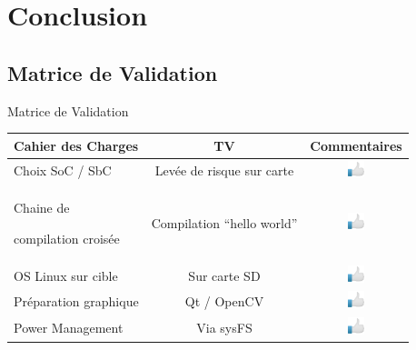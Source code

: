 \documentclass[11pt]{beamer}
\begin{document}
	
	\section{Conclusion}
	\subsection{Matrice de Validation}
	\begin{frame}{Matrice de Validation}

	\begin{center}
	\begin{tabular}{|p{3cm}|c|c|}
			\hline
			\rowcolor{yellow}Cahier des Charges & TV & Commentaires\\
			\hline
			 \centering Choix SoC / SbC & Levée de risque sur carte & \includegraphics[width=0.5cm]{common/ok.png} \\
			\hline
			 \centering Chaine de \par compilation croisée & Compilation ``hello world'' & \includegraphics[width=0.5cm]{common/ok.png} \\
			\hline
			 \centering OS Linux sur cible & Sur carte SD & \includegraphics[width=0.5cm]{common/ok.png} \\
			\hline
			 \centering Préparation graphique & Qt / OpenCV & \includegraphics[width=0.5cm]{common/ok.png} \\
			\hline
			 \centering Power Management & Via sysFS & \includegraphics[width=0.5cm]{common/ok.png} \\
				
			\hline
			\end{tabular}
	\end{center}
	\end{frame}
\end{document}
